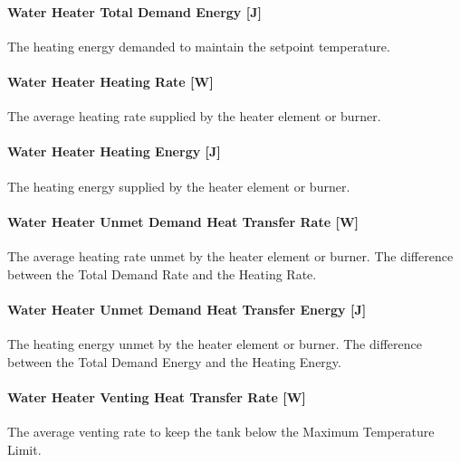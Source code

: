 \paragraph{Water Heater Total Demand Energy {[}J{]}}\label{water-heater-total-demand-energy-j}

The heating energy demanded to maintain the setpoint temperature.

\paragraph{Water Heater Heating Rate {[}W{]}}\label{water-heater-heating-rate-w-000}

The average heating rate supplied by the heater element or burner.

\paragraph{Water Heater Heating Energy {[}J{]}}\label{water-heater-heating-energy-j-000}

The heating energy supplied by the heater element or burner.

\paragraph{Water Heater Unmet Demand Heat Transfer Rate {[}W{]}}\label{water-heater-unmet-demand-heat-transfer-rate-w}

The average heating rate unmet by the heater element or burner. The difference between the Total Demand Rate and the Heating Rate.

\paragraph{Water Heater Unmet Demand Heat Transfer Energy {[}J{]}}\label{water-heater-unmet-demand-heat-transfer-energy-j}

The heating energy unmet by the heater element or burner. The difference between the Total Demand Energy and the Heating Energy.

\paragraph{Water Heater Venting Heat Transfer Rate {[}W{]}}\label{water-heater-venting-heat-transfer-rate-w}

The average venting rate to keep the tank below the Maximum Temperature Limit.

